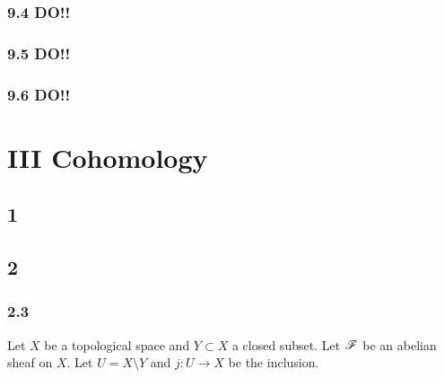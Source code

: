 \documentclass[12pt]{article}
\begin{document}
\subsubsection{9.4 DO!!}

\subsubsection{9.5 DO!!}

\subsubsection{9.6 DO!!}


\section{III Cohomology}

\subsection{1}


\subsection{2}

\subsubsection{2.3}

Let $X$ be a topological space and $Y \subset X$ a closed subset. Let $\mathscr{F}$ be an abelian sheaf on $X$. Let $U = X \setminus Y$ and $j : U \to X$ be the inclusion.
\end{document}
